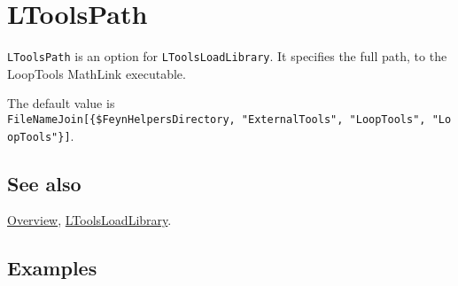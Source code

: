 \documentclass[../FeynHelpersManual.tex]{subfiles}
\begin{document}
\hypertarget{ltoolspath}{
\section{LToolsPath}\label{ltoolspath}}

\texttt{LToolsPath} is an option for \texttt{LToolsLoadLibrary}. It
specifies the full path, to the LoopTools MathLink executable.

The default value is
\texttt{FileNameJoin[\allowbreak{}\{\allowbreak{}\$FeynHelpersDirectory,\ \allowbreak{}"ExternalTools",\ \allowbreak{}"LoopTools",\ \allowbreak{}"LoopTools"\}]}.

\subsection{See also}

\hyperlink{toc}{Overview},
\hyperlink{ltoolsloadlibrary}{LToolsLoadLibrary}.

\subsection{Examples}
\end{document}
